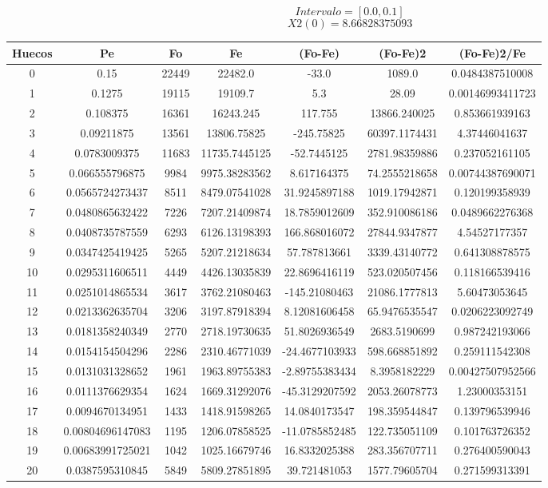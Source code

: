 \documentclass{article}
\begin{document}
$$
Intervalo = [0.0, 0.1]
$$
$$
X2(0) = 8.66828375093
$$
\begin{tabular}{|c|c|c|c|c|c|c|}
Huecos&Pe&Fo&Fe&(Fo{-}Fe)&(Fo{-}Fe)2&(Fo{-}Fe)2/Fe\\
\hline
0&0.15&22449&22482.0&{-}33.0&1089.0&0.0484387510008\\
\hline
1&0.1275&19115&19109.7&5.3&28.09&0.00146993411723\\
\hline
2&0.108375&16361&16243.245&117.755&13866.240025&0.853661939163\\
\hline
3&0.09211875&13561&13806.75825&{-}245.75825&60397.1174431&4.37446041637\\
\hline
4&0.0783009375&11683&11735.7445125&{-}52.7445125&2781.98359886&0.237052161105\\
\hline
5&0.066555796875&9984&9975.38283562&8.617164375&74.2555218658&0.00744387690071\\
\hline
6&0.0565724273437&8511&8479.07541028&31.9245897188&1019.17942871&0.120199358939\\
\hline
7&0.0480865632422&7226&7207.21409874&18.7859012609&352.910086186&0.0489662276368\\
\hline
8&0.0408735787559&6293&6126.13198393&166.868016072&27844.9347877&4.54527177357\\
\hline
9&0.0347425419425&5265&5207.21218634&57.787813661&3339.43140772&0.641308878575\\
\hline
10&0.0295311606511&4449&4426.13035839&22.8696416119&523.020507456&0.118166539416\\
\hline
11&0.0251014865534&3617&3762.21080463&{-}145.21080463&21086.1777813&5.60473053645\\
\hline
12&0.0213362635704&3206&3197.87918394&8.12081606458&65.9476535547&0.0206223092749\\
\hline
13&0.0181358240349&2770&2718.19730635&51.8026936549&2683.5190699&0.987242193066\\
\hline
14&0.0154154504296&2286&2310.46771039&{-}24.4677103933&598.668851892&0.259111542308\\
\hline
15&0.0131031328652&1961&1963.89755383&{-}2.89755383434&8.3958182229&0.00427507952566\\
\hline
16&0.0111376629354&1624&1669.31292076&{-}45.3129207592&2053.26078773&1.23000353151\\
\hline
17&0.0094670134951&1433&1418.91598265&14.0840173547&198.359544847&0.139796539946\\
\hline
18&0.00804696147083&1195&1206.07858525&{-}11.0785852485&122.735051109&0.101763726352\\
\hline
19&0.00683991725021&1042&1025.16679746&16.8332025388&283.356707711&0.276400590043\\
\hline
20&0.0387595310845&5849&5809.27851895&39.721481053&1577.79605704&0.271599313391\\
\end{tabular}
\end{document}
